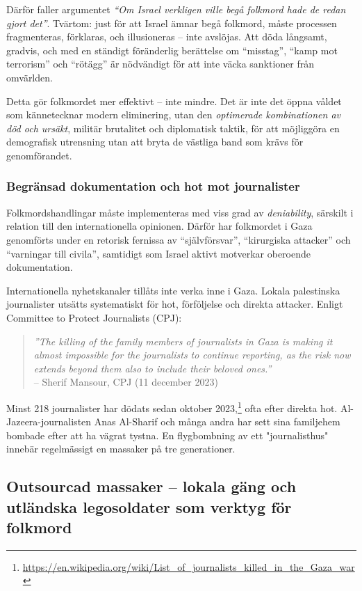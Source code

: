 Därför faller argumentet \textit{“Om Israel verkligen ville begå folkmord hade de redan gjort det”}. Tvärtom: just för att Israel ämnar begå folkmord, måste processen fragmenteras, förklaras, och illusioneras – inte avslöjas. Att döda långsamt, gradvis, och med en ständigt föränderlig berättelse om “misstag”, “kamp mot terrorism” och “rötägg” är nödvändigt för att inte väcka sanktioner från omvärlden.

Detta gör folkmordet mer effektivt – inte mindre. Det är inte det öppna våldet som kännetecknar modern eliminering, utan den \textit{optimerade kombinationen av död och ursäkt}, militär brutalitet och diplomatisk taktik, för att möjliggöra en demografisk utrensning utan att bryta de västliga band som krävs för genomförandet.


\subsubsection*{Begränsad dokumentation och hot mot journalister}
Folkmordshandlingar måste implementeras med viss grad av \textit{deniability}, särskilt i relation till den internationella opinionen. Därför har folkmordet i Gaza genomförts under en retorisk fernissa av \enquote{självförsvar}, \enquote{kirurgiska attacker} och \enquote{varningar till civila}, samtidigt som Israel aktivt motverkar oberoende dokumentation.

Internationella nyhetskanaler tillåts inte verka inne i Gaza. Lokala palestinska journalister utsätts systematiskt för hot, förföljelse och direkta attacker. Enligt Committee to Protect Journalists (CPJ):

\begin{quote}
\textit{”The killing of the family members of journalists in Gaza is making it almost impossible for the journalists to continue reporting, as the risk now extends beyond them also to include their beloved ones.”} \\
\textup{– Sherif Mansour, CPJ (11 december 2023)}
\end{quote}

Minst 218 journalister har dödats sedan oktober 2023,\footnote{\url{https://en.wikipedia.org/wiki/List_of_journalists_killed_in_the_Gaza_war}} ofta efter direkta hot. Al-Jazeera-journalisten Anas Al-Sharif och många andra har sett sina familjehem bombade efter att ha vägrat tystna. En flygbombning av ett "journalisthus" innebär regelmässigt en massaker på tre generationer.


\subsection{Outsourcad massaker – lokala gäng och utländska legosoldater som verktyg för folkmord}

